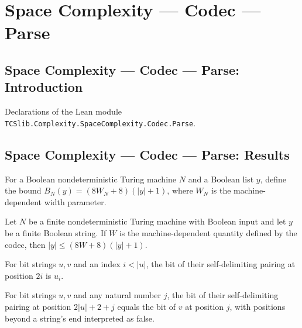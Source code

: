 \section{Space Complexity --- Codec --- Parse}
\subsection*{Space Complexity --- Codec --- Parse: Introduction}

Declarations of the Lean module \texttt{TCSlib.Complexity.SpaceComplexity.Codec.Parse}.

\subsection*{Space Complexity --- Codec --- Parse: Results}

\begin{definition}
\label{Complexity.Codec.bnd}
\leanok
{}
For a Boolean nondeterministic Turing machine $N$ and a Boolean list $y$, define the
bound $B_N(y)=(8W_N+8)(|y|+1)$, where $W_N$ is the machine-dependent width parameter.
\end{definition}

\begin{lemma}
\label{Complexity.Codec.length_le_bnd}
\leanok
{}
Let $N$ be a finite nondeterministic Turing machine with Boolean input and let $y$ be a
finite Boolean string. If $W$ is the machine-dependent quantity defined by the codec,
then $|y| \le (8W+8)(|y|+1)$.
\end{lemma}

\begin{lemma}
\label{Complexity.Codec.pe_getD_fst}
\leanok
{}
For bit strings $u,v$ and an index $i<|u|$, the bit of their self-delimiting pairing at
position $2i$ is $u_i$.
\end{lemma}

\begin{lemma}
\label{Complexity.Codec.pe_getD_snd}
\leanok
{}
For bit strings $u,v$ and any natural number $j$, the bit of their self-delimiting
pairing at position $2|u|+2+j$ equals the bit of $v$ at position $j$, with positions
beyond a string's end interpreted as false.
\end{lemma}

